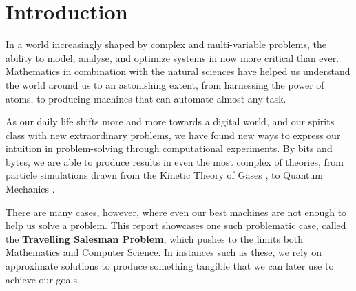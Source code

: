 
\section{Introduction}
\label{sec: intro}

In a world increasingly shaped by complex and multi-variable problems, the ability to model, analyse, and optimize systems in now more critical than ever. Mathematics in combination with the natural sciences have helped us understand the world around us to an astonishing extent, from harnessing the power of atoms, to producing machines that can automate almost any task.

As our daily life shifts more and more towards a digital world, and our spirits class with new extraordinary problems, we have found new ways to express our intuition in problem-solving through computational experiments. By bits and bytes, we are able to produce results in even the most complex of theories, from particle simulations drawn from the Kinetic Theory of Gases \cite{pareschi2001introduction}, to Quantum Mechanics \cite{miceli2018quantum}.

There are many cases, however, where even our best machines are not enough to help us solve a problem. This report showcases one such problematic case, called the \textbf{Travelling Salesman Problem}, which pushes to the limits both Mathematics and Computer Science. In instances such as these, we rely on approximate solutions to produce something tangible that we can later use to achieve our goals.
